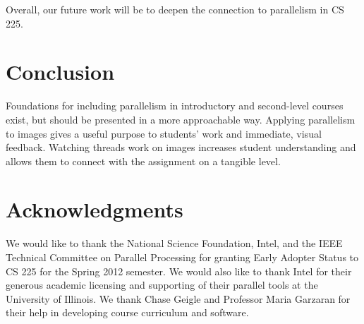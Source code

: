 \documentclass[conference]{./IEEEtran}
\begin{document}
Overall, our future work will be to deepen the connection to parallelism in CS
225.

\section{Conclusion}

Foundations for including parallelism in introductory and second-level courses
exist, but should be presented in a more approachable way. Applying parallelism
to images gives a useful purpose to students' work and immediate, visual
feedback. Watching threads work on images increases student understanding and
allows them to connect with the assignment on a tangible level.  

\section*{Acknowledgments}

We would like to thank the National Science Foundation, Intel, and the IEEE
Technical Committee on Parallel Processing for granting Early Adopter Status to
CS 225 for the Spring 2012 semester. We would also like to thank Intel for their
generous academic licensing and supporting of their parallel tools at the
University of Illinois. We thank Chase Geigle and Professor Maria Garzaran for
their help in developing course curriculum and software.



\end{document}
